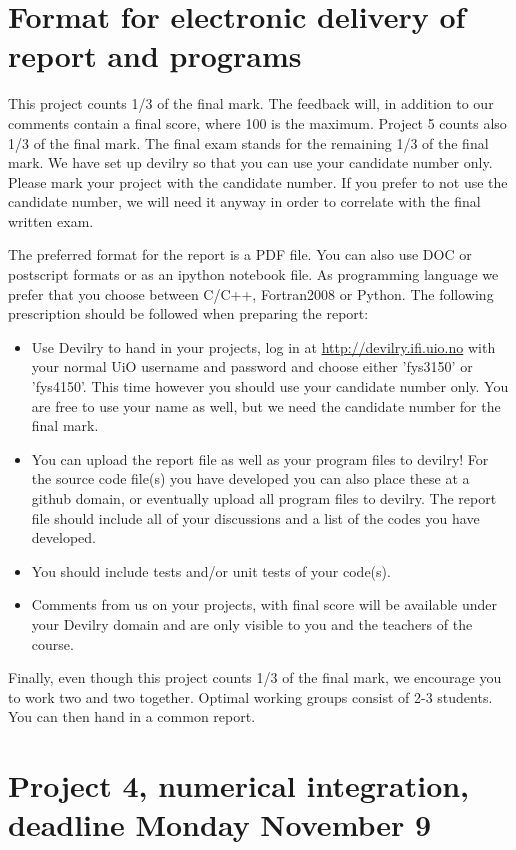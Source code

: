 \documentclass[11pt,a4wide]{article}
\begin{document}
\section*{Format for electronic delivery of report and programs}
%
This project counts 1/3 of the final mark. The feedback will, in addition to our comments contain a final score, where 100 is the maximum. Project 5 counts also 1/3 of the final mark. The final exam stands for the remaining 1/3 of the final mark.
We have set up devilry so that you can use your candidate number only. Please mark your project with the candidate number. If you prefer to not use the candidate number, we will need it anyway in order to correlate with the final written exam. 

The preferred format for the report is a PDF file. You can also
use DOC or postscript formats or as an ipython notebook file. 
As programming language we prefer that you choose between C/C++, Fortran2008 or Python.
The following prescription should be followed when preparing the report:
\begin{itemize}
\item Use Devilry to hand in your projects, log in  at 
\url{ http://devilry.ifi.uio.no} with your normal UiO username and password
and choose either 'fys3150' or 'fys4150'. This time however you should use your candidate number only. You are free to use your name as well, but we need the candidate number for the final mark. 
\item You can upload the report file as well as your program files to devilry!  For the source code file(s) you have developed you can also place these at  a github domain, or eventually upload all program files to devilry.  
The report file should include all of your discussions and a list of the codes you have developed. 
\item You should include tests and/or unit tests of your code(s).
\item Comments  from us on your projects, with final score
will be available under
your Devilry domain and are only visible to you and the teachers of the course.

\end{itemize}

Finally, even though this project counts 1/3 of the final mark, 
we encourage you to work two and two together. Optimal working groups consist of 
2-3 students. You can then hand in a common report. 


\section*{Project 4, numerical integration, deadline  Monday November 9}
\end{document}
